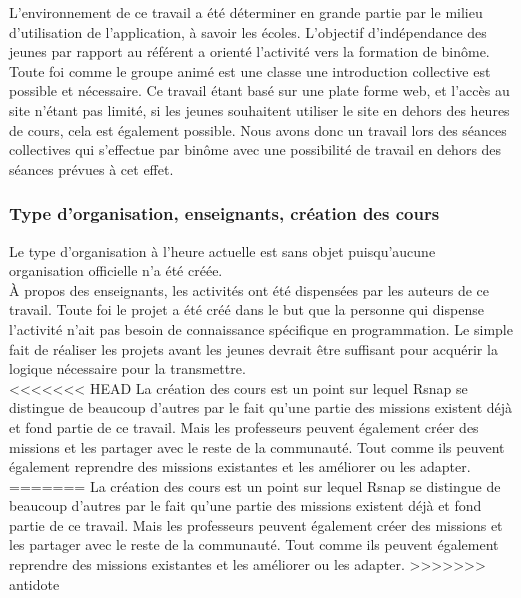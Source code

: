 L'environnement de ce travail a été déterminer en grande partie par le milieu d'utilisation de l'application, à savoir les écoles. L'objectif d'indépendance des jeunes par rapport au référent a orienté l'activité vers la formation de binôme. Toute foi comme le groupe animé est une classe une introduction collective est possible et nécessaire. Ce travail étant basé sur une plate forme web, et l'accès au site n'étant pas limité, si les jeunes souhaitent utiliser le site en dehors des heures de cours, cela est également possible.
Nous avons donc un travail lors des séances collectives qui s'effectue par binôme avec une possibilité de travail en dehors des séances prévues à cet effet.

\subsubsection{Type d'organisation, enseignants, création des cours}
Le type d'organisation à l'heure actuelle est sans objet puisqu'aucune organisation officielle n'a été créée.\\

À propos des enseignants, les activités ont été dispensées par les auteurs de ce travail. Toute foi le projet a été créé dans le but que la personne qui dispense l'activité n'ait pas besoin de connaissance spécifique en programmation. Le simple fait de réaliser les projets avant les jeunes devrait être suffisant pour acquérir la logique nécessaire pour la transmettre.\\

<<<<<<< HEAD
La création des cours est un point sur lequel \gls{Rsnap} se distingue de beaucoup d'autres par le fait qu'une partie des \glspl{mission} existent déjà et fond partie de ce travail. Mais les professeurs peuvent également créer des \glspl{mission} et les partager avec le reste de la communauté. Tout comme ils peuvent également reprendre des \glspl{mission} existantes et les améliorer ou les adapter. %
=======
La création des cours est un point sur lequel Rsnap se distingue de beaucoup d'autres par le fait qu'une partie des missions existent déjà et fond partie de ce travail. Mais les professeurs peuvent également créer des missions et les partager avec le reste de la communauté. Tout comme ils peuvent également reprendre des missions existantes et les améliorer ou les adapter. %
>>>>>>> antidote
